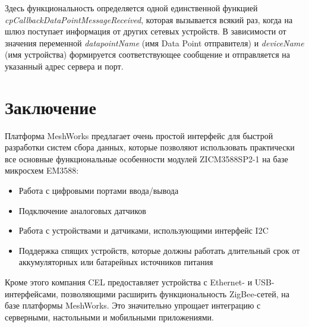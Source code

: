 \documentclass[12pt]{article}
\begin{document}
Здесь функциональность определяется одной единственной функцией 
\emph{cpCallbackDataPointMessageReceived}, которая вызывается всякий раз, когда 
на шлюз поступает информация от других сетевых устройств. В зависимости от значения
переменной \emph{datapointName} (имя Data Point отправителя) и \emph{deviceName} (имя 
устройства) формируется соответствующее сообщение и отправляется на указанный адрес
сервера и порт.
\section{Заключение}
Платформа MeshWorks предлагает очень простой интерфейс для быстрой разработки систем
сбора данных, которые позволяют использовать практически все основные функциональные
особенности модулей ZICM3588SP2-1 на базе микросхем EM3588:
\begin{itemize}
 \item Работа с цифровыми портами ввода/вывода
 \item Подключение аналоговых датчиков
 \item Работа с устройствами и датчиками, использующими интерфейс I2C
 \item Поддержка спящих устройств, которые должны работать длительный срок от
 аккумуляторных или батарейных источников питания
\end{itemize}
Кроме этого компания CEL предоставляет устройства с Ethernet- и USB-интерфейсами, 
позволяющими расширить функциональность ZigBee-сетей, на базе платформы MeshWorks.
Это значительно упрощает интеграцию с серверными, настольными и мобильными приложениями.
\end{document}
